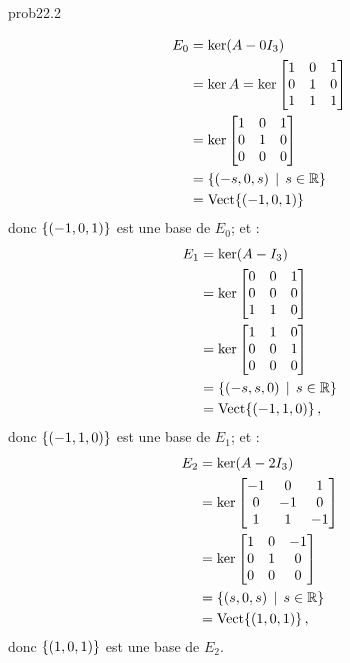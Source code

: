 \begin{sol}{prob22.2}
\begin{enumerate}[]
\begin{align*}
E_0&=\ker(A-0I_3)\\
&=\ker A=\ker\bmatrix 
1&0&1\\0&1&0\\1&1&1 \endbmatrix\\
& =\ker \bmatrix 
 1 & 0 & 1 \\
 0 & 1 & 0 \\
 0 & 0 & 0 \endbmatrix \\
&=\set{(-s,0,s)\st s\in \R}\\
&=\sp{(-1,0,1)}\, \end{align*} 
donc $\{(-1,0,1)\} $ est une base de $E_0$; et :
\begin{align*}
E_1&=\ker(A-I_3)\\ 
&=\ker\bmatrix 
0&0&1\\0&0&0\\1&1&0 \endbmatrix \\
&=\ker \bmatrix 
 1 & 1 & 0 \\
 0 & 0 & 1 \\
 0 & 0 & 0 \endbmatrix \\
&=\set{(-s,s,0)\st s\in \R}\\
&=\sp{(-1,1,0)}\,,\end{align*} 
donc $\{(-1,1,0)\} $ est une base de $E_1$; et :
\begin{align*}
	E_2&=\ker(A-2I_3) \\
	&=\ker\bmatrix
-1&0&1\\0&-1&0\\1&1&-1 \endbmatrix  \\
&=\ker \bmatrix 
 1 & 0 & -1 \\
 0 & 1 & 0 \\
 0 & 0 & 0  \endbmatrix \\
 &=\set{(s,0,s)\st s\in \R}\\
 &=\sp{(1,0,1)}\,,
 \end{align*}
donc $\{(1,0,1)\} $ est une base de $E_2$.
\medskip


\end{enumerate}
\end{sol}

